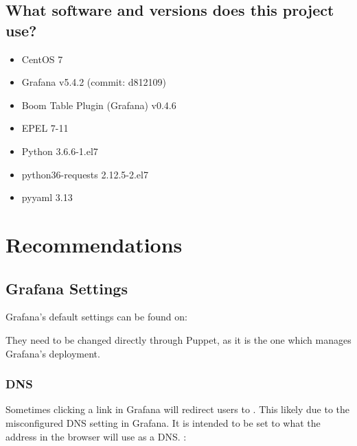 \documentclass[letterpaper,10pt,english]{sphinxmanual}
\begin{document}
\subsection{What software and versions does this project use?}
\label{\detokenize{readme:what-software-and-versions-does-this-project-use}}\begin{itemize}
\item {} 
CentOS 7

\item {} 
Grafana v5.4.2 (commit: d812109)

\item {} 
Boom Table Plugin (Grafana) v0.4.6

\item {} 
EPEL 7-11

\item {} 
Python 3.6.6-1.el7

\item {} 
python36-requests 2.12.5-2.el7

\item {} 
pyyaml 3.13

\end{itemize}


\section{Recommendations}
\label{\detokenize{readme:recommendations}}

\subsection{Grafana Settings}
\label{\detokenize{readme:grafana-settings}}
Grafana’s default settings can be found on:

\begin{sphinxVerbatim}[commandchars=\\\{\}]
\end{sphinxVerbatim}

They need to be changed directly through Puppet, as it is the one which manages
Grafana’s deployment.


\subsubsection{DNS}
\label{\detokenize{readme:dns}}
Sometimes clicking a link in Grafana will redirect users to . This
likely due to the misconfigured DNS setting in Grafana. It is intended to be
set to what the address in the browser will use as a DNS.
:
\end{document}
